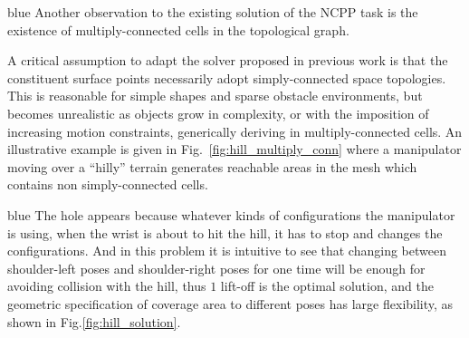 \documentclass[Afour,sageh,times]{sagej}
\begin{document}
\begin{color}{blue}
Another observation to the existing solution of the NCPP task is the existence of multiply-connected cells in the topological graph. 
\end{color}
A critical assumption to adapt the solver proposed in previous work is that the constituent surface points necessarily adopt simply-connected space topologies. 
This is reasonable for simple shapes and sparse obstacle environments, but becomes unrealistic as objects grow in complexity, 
or with the imposition of increasing motion constraints, generically deriving in multiply-connected cells. An illustrative example is given in Fig.~\ref{fig:hill_multiply_conn} where a manipulator moving over a ``hilly'' terrain generates reachable areas in the mesh which contains non simply-connected cells. 
\begin{color}{blue}
The hole appears because whatever kinds of configurations the manipulator is using, when the wrist is about to hit the hill, it has to stop and changes the configurations. And in this problem it is intuitive to see that changing between shoulder-left poses and shoulder-right poses for one time will be enough for avoiding collision with the hill, thus $1$ lift-off is the optimal solution, and the geometric specification of coverage area to different poses has large flexibility, as shown in Fig.\ref{fig:hill_solution}. 
\end{color}
\end{document}
